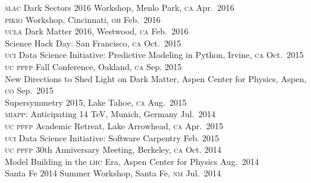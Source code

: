 \documentclass[margin,line]{resume}
\newcommand{\scap}[1]{\textsc{\MakeLowercase{#1}}}
\begin{document}
\begin{resume}
%
\scap{SLAC} Dark Sectors 2016 Workshop, Menlo Park, \scap{CA}
\hfill 
Apr.~2016\vspace{.7mm}\\   
%
\scap{PIKIO} Workshop, Cincinnati, \scap{OH}
\hfill 
Feb.~2016\vspace{.7mm}\\   
%
\scap{UCLA} Dark Matter 2016, Westwood, \scap{CA}
\hfill 
Feb.~2016\vspace{.7mm}\\   
%
Science Hack Day: San Francisco, \scap{CA}
\hfill 
Oct.~2015\vspace{.7mm}\\   
%
\scap{UCI} Data Science Initiative: Predictive Modeling in Python, Irvine, \scap{CA}
\hfill 
Oct.~2015\vspace{.7mm}\\   
%
\scap{UC PPFP} Fall Conference, Oakland, \scap{CA}
\hfill 
Sep. 2015\vspace{.7mm}\\   
%
New Directions to Shed Light on Dark Matter, Aspen Center for Physics, Aspen, \scap{CO}
\hfill Sep.~2015\vspace{.7mm}\\   
%
Supersymmetry 2015, Lake Tahoe, \scap{CA}
\hfill Aug.~2015\vspace{.7mm}\\   
%
\scap{MIAPP}: Anticipating 14 TeV, Munich, Germany
\hfill Jul.~2014\vspace{.7mm}\\   
%
\scap{UC PPFP} Academic Retreat, Lake Arrowhead, \scap{CA}
\hfill Apr.~2015\vspace{.7mm}\\   
%
\scap{UCI} Data Science Initiative: Software Carpentry
\hfill 
Feb. 2015\vspace{.7mm}\\   
%
\scap{UC PPFP} 30th Anniversary Meeting, Berkeley, \scap{CA}
\hfill 
Oct. 2014\vspace{.7mm}\\   
%
Model Building in the \scap{LHC} Era, Aspen Center for Physics
\hfill Aug.~2014\vspace{.7mm}\\   
%
Santa Fe 2014 Summer Workshop, Santa Fe, \scap{NM}
\hfill Jul.~2014\vspace{.7mm}\\   

\end{resume}
\end{document}
